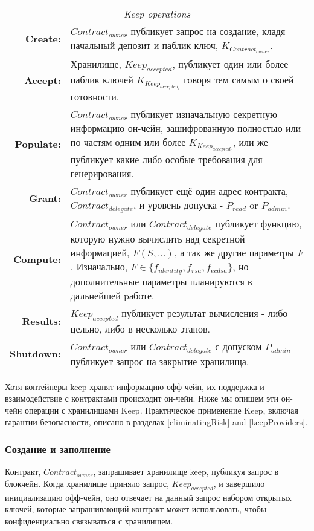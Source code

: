 \documentclass[english,main=russian,11pt]{article}
\begin{document}
\begin{table*}[t]
  \centering
  \begin{tabular}{|rp{10cm}|}
  \hline
  \multicolumn{2}{|c|}{\textit{Keep operations}} \\
  \textbf{Create:} & $Contract_{owner}$ публикует запрос на создание, 
  кладя начальный депозит и паблик ключ, $K_{Contract_{owner}}$.\\
  \textbf{Accept:} & Хранилище, $Keep_{accepted}$, публикует один 
  или более паблик ключей $K_{Keep_{accepted_i}}$ говоря тем самым 
  о своей готовности.\\
  \textbf{Populate:} & $Contract_{owner}$ публикует изначальную 
  секретную информацию он-чейн, зашифрованную полностью или по частям 
  одним или более $K_{Keep_{accepted_i}}$, или же публикует какие-либо 
  особые требования для генерирования.\\
  \textbf{Grant:} & $Contract_{owner}$ публикует ещё один адрес 
  контракта, $Contract_{delegate}$, и уровень допуска - 
  $P_{read}$ or $P_{admin}$.\\
  \textbf{Compute:} & $Contract_{owner}$ или $Contract_{delegate}$
  публикует функцию, которую нужно вычислить над секретной информацией, 
  $F(S,...)$, а так же другие параметры $F$. Изначально, $F {\in}
  \{f_{identity},f_{rsa},f_{ecdsa}\}$, но дополнительные параметры 
  планируются в дальнейшей pаботе.\\
  \textbf{Results:} & $Keep_{accepted}$ публикует результат 
  вычисления - либо цельно, либо в несколько этапов.\\
  \textbf{Shutdown:} & $Contract_{owner}$ или $Contract_{delegate}$
  с допуском $P_{admin}$ публикует запрос на закрытие хранилища.\\
  \hline
\end{tabular}
\end{table*}

Хотя контейнеры keep хранят информацию офф-чейн, их поддержка и 
взаимодействие с контрактами происходит он-чейн. Ниже мы опишем 
эти он-чейн операции с хранилищами Keep. Практическое применение 
Keep, включая гарантии безопасности, описано в разделах \ref{eliminatingRisk} 
and \ref{keepProviders}.

\subsubsection{Создание и заполнение}

Контракт, $Contract_{owner}$, запрашивает хранилище keep, публикуя запрос 
в блокчейн. Когда хранилище приняло запрос, $Keep_{accepted}$, и завершило 
инициализацию офф-чейн, оно отвечает на данный запрос набором открытых 
ключей, которые запрашивающий контракт может использовать, чтобы 
конфиденциально связываться с хранилищем. 
\end{document}
